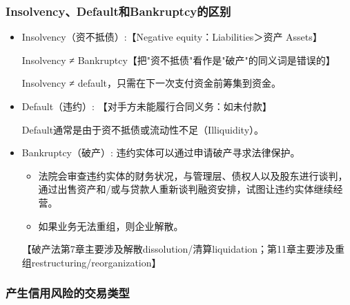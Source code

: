 \subsubsection{Insolvency、Default和Bankruptcy的区别}
\begin{itemize}
\item Insolvency（资不抵债）:【Negative equity：Liabilities＞资产 Assets】

Insolvency ≠ Bankruptcy【把"资不抵债"看作是"破产"的同义词是错误的】

 Insolvency ≠  default，只需在下一次支付资金前筹集到资金。

\item Default（违约）: 【对手方未能履行合同义务：如未付款】

 Default通常是由于资不抵债或流动性不足（Illiquidity）。

\item Bankruptcy（破产）: 违约实体可以通过申请破产寻求法律保护。

\begin{itemize}

\item 法院会审查违约实体的财务状况，与管理层、债权人以及股东进行谈判，通过出售资产和/或与贷款人重新谈判融资安排，试图让违约实体继续经营。

\item 如果业务无法重组，则企业解散。
\end{itemize}

【破产法第7章主要涉及解散dissolution/清算liquidation；第11章主要涉及重组restructuring/reorganization】

\end{itemize}





\subsubsection{产生信用风险的交易类型}

